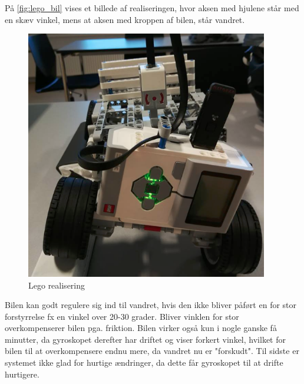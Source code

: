 På \autoref{fig:lego_bil} vises et billede af realiseringen, hvor aksen med hjulene står med en skæv vinkel, mens at aksen med kroppen af bilen, står vandret. 

\begin{figure}[H]
	\centering
	\includegraphics[width = 300pt]{figur/lego_bil}
	\caption{Lego realisering}
	\label{fig:lego_bil}
\end{figure}   

Bilen kan godt regulere sig ind til vandret, hvis den ikke bliver påført en for stor forstyrrelse fx en vinkel over 20-30 grader. Bliver vinklen for stor overkompenserer bilen pga. friktion. Bilen virker også kun i nogle ganske få minutter, da gyroskopet derefter har driftet og viser forkert vinkel, hvilket for bilen til at overkompensere endnu mere, da vandret nu er "forskudt". Til sidste er systemet ikke glad for hurtige ændringer, da dette får gyroskopet til at drifte hurtigere.